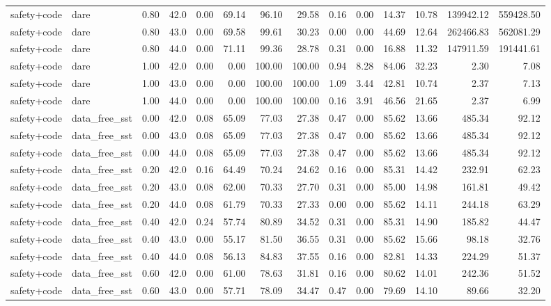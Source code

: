 \documentclass{article}
\begin{document}
\begin{table}[H]
{\begin{tabular}{llllrrrrrrrrrr}
safety+code & dare & 0.80 & 42.0 & 0.00 & 69.14 & 96.10 & 29.58 & 0.16 & 0.00 & 14.37 & 10.78 & 139942.12 & 559428.50 \\
safety+code & dare & 0.80 & 43.0 & 0.00 & 69.58 & 99.61 & 30.23 & 0.00 & 0.00 & 44.69 & 12.64 & 262466.83 & 562081.29 \\
safety+code & dare & 0.80 & 44.0 & 0.00 & 71.11 & 99.36 & 28.78 & 0.31 & 0.00 & 16.88 & 11.32 & 147911.59 & 191441.61 \\
safety+code & dare & 1.00 & 42.0 & 0.00 & 0.00 & 100.00 & 100.00 & 0.94 & 8.28 & 84.06 & 32.23 & 2.30 & 7.08 \\
safety+code & dare & 1.00 & 43.0 & 0.00 & 0.00 & 100.00 & 100.00 & 1.09 & 3.44 & 42.81 & 10.74 & 2.37 & 7.13 \\
safety+code & dare & 1.00 & 44.0 & 0.00 & 0.00 & 100.00 & 100.00 & 0.16 & 3.91 & 46.56 & 21.65 & 2.37 & 6.99 \\
safety+code & data\_free\_sst & 0.00 & 42.0 & 0.08 & 65.09 & 77.03 & 27.38 & 0.47 & 0.00 & 85.62 & 13.66 & 485.34 & 92.12 \\
safety+code & data\_free\_sst & 0.00 & 43.0 & 0.08 & 65.09 & 77.03 & 27.38 & 0.47 & 0.00 & 85.62 & 13.66 & 485.34 & 92.12 \\
safety+code & data\_free\_sst & 0.00 & 44.0 & 0.08 & 65.09 & 77.03 & 27.38 & 0.47 & 0.00 & 85.62 & 13.66 & 485.34 & 92.12 \\
safety+code & data\_free\_sst & 0.20 & 42.0 & 0.16 & 64.49 & 70.24 & 24.62 & 0.16 & 0.00 & 85.31 & 14.42 & 232.91 & 62.23 \\
safety+code & data\_free\_sst & 0.20 & 43.0 & 0.08 & 62.00 & 70.33 & 27.70 & 0.31 & 0.00 & 85.00 & 14.98 & 161.81 & 49.42 \\
safety+code & data\_free\_sst & 0.20 & 44.0 & 0.08 & 61.79 & 70.33 & 27.33 & 0.00 & 0.00 & 85.62 & 14.11 & 244.18 & 63.29 \\
safety+code & data\_free\_sst & 0.40 & 42.0 & 0.24 & 57.74 & 80.89 & 34.52 & 0.31 & 0.00 & 85.31 & 14.90 & 185.82 & 44.47 \\
safety+code & data\_free\_sst & 0.40 & 43.0 & 0.00 & 55.17 & 81.50 & 36.55 & 0.31 & 0.00 & 85.62 & 15.66 & 98.18 & 32.76 \\
safety+code & data\_free\_sst & 0.40 & 44.0 & 0.08 & 56.13 & 84.83 & 37.55 & 0.16 & 0.00 & 82.81 & 14.33 & 224.29 & 51.37 \\
safety+code & data\_free\_sst & 0.60 & 42.0 & 0.00 & 61.00 & 78.63 & 31.81 & 0.16 & 0.00 & 80.62 & 14.01 & 242.36 & 51.52 \\
safety+code & data\_free\_sst & 0.60 & 43.0 & 0.00 & 57.71 & 78.09 & 34.47 & 0.47 & 0.00 & 79.69 & 14.10 & 89.66 & 32.20 \\

\end{tabular}}
\end{table}
\end{document}

